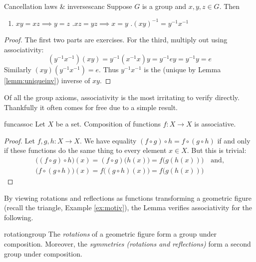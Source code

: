 \goodbreak



\begin{thm}{Cancellation laws \& inverses}{canc}
	Suppose $G$ is a group and $x,y,z\in G$. Then
	\begin{enumerate}\itemsep2pt
	  \item $xy=xz\implies y=z$ \qquad{}.\lstsp $xz=yz\implies x=y$ \qquad{}.\lstsp $(xy)^{-1}=y^{-1}x^{-1}$
	\end{enumerate}
\end{thm}

\begin{proof}
	The first two parts are exercises. For the third, multiply out using associativity:
	\[
		(y^{-1}x^{-1})(xy)=y^{-1}(x^{-1}x)y=y^{-1}ey=y^{-1}y=e
	\]
	Similarly $(xy)(y^{-1}x^{-1})=e$. Thus $y^{-1}x^{-1}$ is the (unique by Lemma \ref{lemm:uniqueinv}) inverse of $xy$.
\end{proof}



\label{sec:assoc}

Of all the group axioms, associativity is the most irritating to verify directly. Thankfully it often comes for free due to a simple result.

\begin{lemm}{}{funcassoc}
	Let $X$ be a set. Composition of functions $f:X\to X$ is associative.
\end{lemm}

\begin{proof}
	Let $f,g,h:X\to X$. We have equality $(f\circ g)\circ h=f\circ(g\circ h)$ if and only if these functions do the same thing to every element $x\in X$. But this is trivial:
	\begin{gather*}
		\bigl((f\circ g)\circ h\bigr)(x)=(f\circ g)\bigl(h(x)\bigr)=f\bigl(g(h(x))\bigr)\quad\text{and,}\\
		\bigl(f\circ(g\circ h)\bigr)(x)=f\bigl((g\circ h)(x)\bigr)=f\bigl(g(h(x))\bigr) \tag*{\qedhere}
	\end{gather*}
\end{proof}

By viewing rotations and reflections as functions transforming a geometric figure (recall the triangle, Example \ref{ex:motiv}), the Lemma verifies associativity for the following.

\begin{cor}{}{rotationgroup}
	The \emph{rotations} of a geometric figure form a group under composition. Moreover, the \emph{symmetries (rotations and reflections)} form a second group under composition.
\end{cor}

